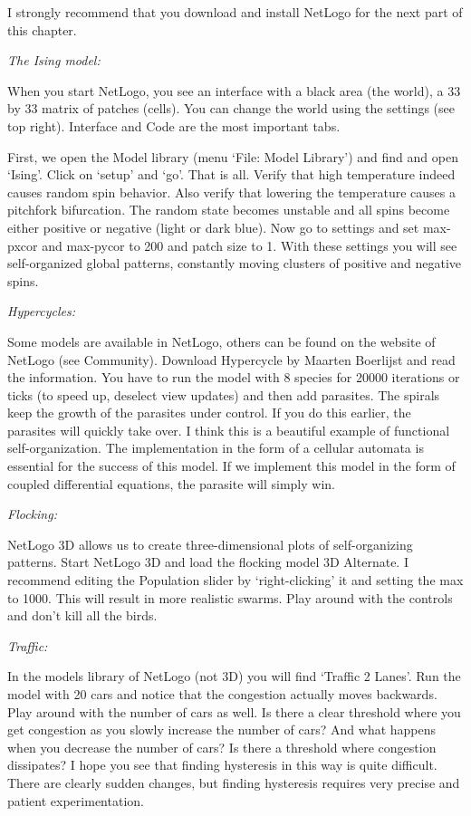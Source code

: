 \documentclass[
  a4paper,
  DIV=11,
  numbers=noendperiod,
  oneside]{scrreprt}
\begin{document}
I strongly recommend that you download and install NetLogo for the next
part of this chapter.

\emph{The Ising model:}

When you start NetLogo, you see an interface with a black area (the
world), a 33 by 33 matrix of patches (cells). You can change the world
using the settings (see top right). Interface and Code are the most
important tabs.

First, we open the Model library (menu `File: Model Library') and find
and open `Ising'. Click on `setup' and `go'. That is all. Verify that
high temperature indeed causes random spin behavior. Also verify that
lowering the temperature causes a pitchfork bifurcation. The random
state becomes unstable and all spins become either positive or negative
(light or dark blue). Now go to settings and set max-pxcor and max-pycor
to 200 and patch size to 1. With these settings you will see
self-organized global patterns, constantly moving clusters of positive
and negative spins.

\emph{Hypercycles:}

Some models are available in NetLogo, others can be found on the website
of NetLogo (see Community). Download Hypercycle by Maarten Boerlijst and
read the information. You have to run the model with 8 species for 20000
iterations or ticks (to speed up, deselect view updates) and then add
parasites. The spirals keep the growth of the parasites under control.
If you do this earlier, the parasites will quickly take over. I think
this is a beautiful example of functional self-organization. The
implementation in the form of a cellular automata is essential for the
success of this model. If we implement this model in the form of coupled
differential equations, the parasite will simply win.

\emph{Flocking:}

NetLogo 3D allows us to create three-dimensional plots of
self-organizing patterns. Start NetLogo 3D and load the flocking model
3D Alternate. I recommend editing the Population slider by
`right-clicking' it and setting the max to 1000. This will result in
more realistic swarms. Play around with the controls and don't kill all
the birds.

\emph{Traffic:}

In the models library of NetLogo (not 3D) you will find `Traffic 2
Lanes'. Run the model with 20 cars and notice that the congestion
actually moves backwards. Play around with the number of cars as well.
Is there a clear threshold where you get congestion as you slowly
increase the number of cars? And what happens when you decrease the
number of cars? Is there a threshold where congestion dissipates? I hope
you see that finding hysteresis in this way is quite difficult. There
are clearly sudden changes, but finding hysteresis requires very precise
and patient experimentation.
\end{document}

